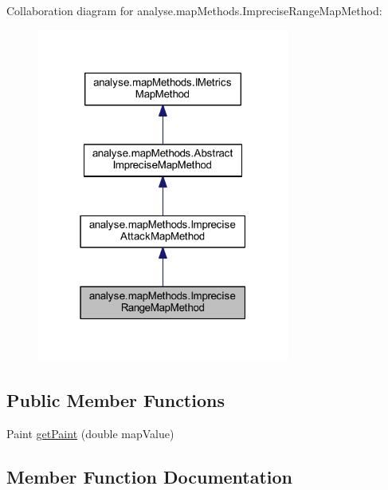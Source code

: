 Collaboration diagram for analyse.\+map\+Methods.\+Imprecise\+Range\+Map\+Method\+:
\nopagebreak
\begin{figure}[H]
\begin{center}
\leavevmode
\includegraphics[width=235pt]{classanalyse_1_1map_methods_1_1_imprecise_range_map_method__coll__graph}
\end{center}
\end{figure}
\subsection*{Public Member Functions}
\begin{DoxyCompactItemize}
\item 
Paint \mbox{\hyperlink{classanalyse_1_1map_methods_1_1_imprecise_range_map_method_a4d98f7426b5e4a8b5f49793978c09f33}{get\+Paint}} (double map\+Value)
\end{DoxyCompactItemize}


\subsection{Member Function Documentation}
\mbox{\label{classanalyse_1_1map_methods_1_1_imprecise_range_map_method_a4d98f7426b5e4a8b5f49793978c09f33}} 
